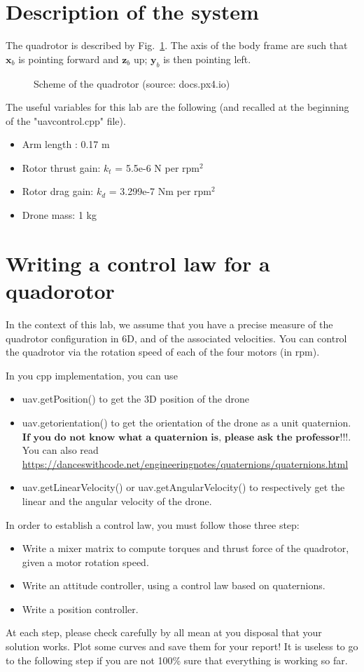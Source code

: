 \documentclass[a4paper]{article}
\begin{document}
\section{Description of the system}
The quadrotor is described by Fig.~\ref{f:quad}. The axis of the body frame are such that $\mathbf{x}_b$ is pointing forward and $\mathbf{z}_b$ up;  $\mathbf{y}_b$ is then pointing left.
%
\begin{figure}
	
	\centering
	\caption{Scheme of the quadrotor (source: docs.px4.io)}
	\label{f:quad}
\end{figure}
%
The useful variables for this lab are the following (and recalled at the beginning of the "uavcontrol.cpp" file).
\begin{itemize}
	\item Arm length : 0.17 m
	\item Rotor thrust gain: $k_t$ = 5.5e-6 N per rpm$^2$
	\item Rotor drag gain: $k_d$ = 3.299e-7 Nm per rpm$^2$
	\item Drone mass: 1 kg
\end{itemize}

\section{Writing a control law for a quadorotor}
In the context of this lab, we assume that you have a precise measure of the quadrotor configuration in 6D, and of the associated velocities. You can control the quadrotor via the rotation speed of each of the four motors (in rpm).

In you cpp implementation, you can use 
\begin{itemize}
	\item uav.getPosition() to get the 3D position of the drone
	\item uav.getorientation() to get the orientation of the drone as a unit quaternion. \\
	$\textbf{If you do not know what a quaternion is, please ask the professor!!!}$.\\
	You can also read \url{https://danceswithcode.net/engineeringnotes/quaternions/quaternions.html}
	\item uav.getLinearVelocity() or uav.getAngularVelocity() to respectively get the linear and the angular velocity of the drone.
\end{itemize}


In order to establish a control law, you must follow those three step:
\begin{itemize}
	\item Write a mixer matrix to compute torques and thrust force of the quadrotor, given a motor rotation speed.
	\item Write an attitude controller, using a control law based on quaternions.
	\item Write a position controller.
\end{itemize}
At each step, please check carefully by all mean at you disposal that your solution works. Plot some curves and save them for your report! It is useless to go to the following step if you are not 100\% sure that everything is working so far.
\end{document}
